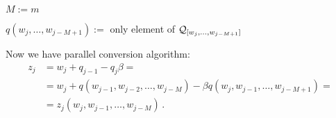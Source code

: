       $M:= m$ 
      
      
      $q(w_j,\dots, w_{j-M+1}):=$ only element of $\mathcal{Q}_{[w_j,\dots, w_{j-M+1}]}$
    



        Now we have parallel conversion algorithm:
    \begin{align*}
    z_j&=w_j + q_{j-1} - q_j \beta = \\
       &=w_j + q(w_{j-1},w_{j-2},\dots, w_{j-M}) - \beta q(w_j,w_{j-1},\dots, w_{j-M+1}) = \\
       &= z_j(w_{j},w_{j-1},\dots, w_{j-M})\,.
    \end{align*}




